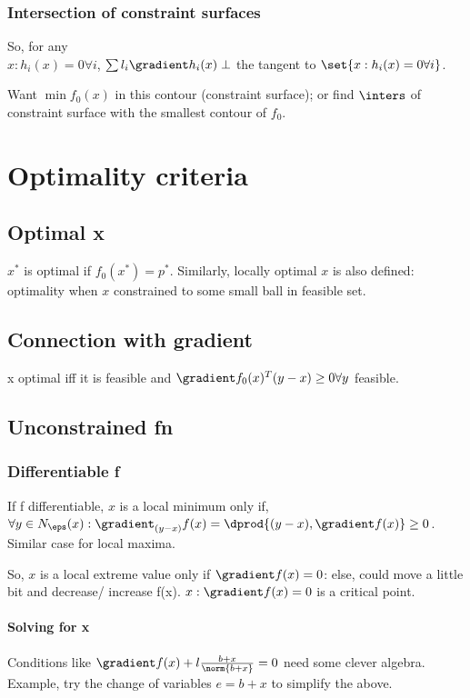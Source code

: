 \documentclass[oneside, article]{memoir}
\begin{document}
\subsubsection{Intersection of constraint surfaces}
So, for any \\
$x:h_i(x) = 0 \forall i$, $\sum l_i \gradient h_i(x) \perp$ the tangent to $\set{x: h_i(x) = 0 \forall i}$.

Want $\min f_0(x)$ in this contour (constraint surface); or find $\inters$ of constraint surface with the smallest contour of $f_0$.

\section{Optimality criteria}
\subsection{Optimal x}
$x^{*}$ is optimal if $f_0(x^{*}) = p^{*}$. Similarly, locally optimal $x$ is also defined: optimality when $x$ constrained to some small ball in feasible set.

\subsection{Connection with gradient}
x optimal iff it is feasible and $\gradient f_0(x)^{T}(y-x) \geq 0 \forall y$ feasible.

\subsection{Unconstrained fn}
\subsubsection{Differentiable f}
If f differentiable, $x$ is a local minimum only if, $\forall y \in N_\eps(x): \gradient_{(y-x)}f(x) = \dprod{(y-x), \gradient f(x)} \geq 0$. Similar case for local maxima.

So, $x$ is a local extreme value only if $\gradient f(x) = 0$: else, could move a little bit and decrease/ increase f(x). $x: \gradient f(x) = 0$ is a critical point.

\paragraph*{Solving for x}
Conditions like $\gradient f(x) + l\frac{b+x}{\norm{b+x}} = 0$ need some clever algebra. Example, try the change of variables $e = b+x$ to simplify the above.
\end{document}

